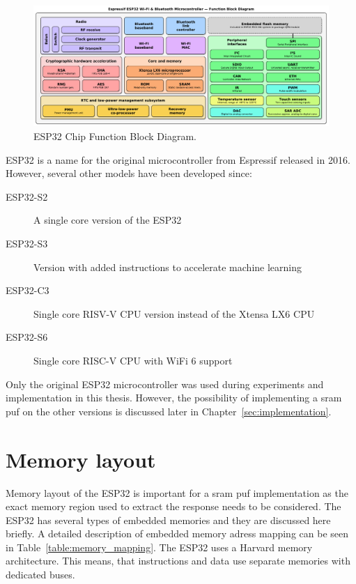 \begin{figure}[ht!]
    \centering
    \captionsetup{justification=centering,margin=0.5cm}
    \includegraphics[width=\textwidth]{images/esp32_diagram.pdf}
    \caption[ESP32 Chip Function Block Diagram.]{ESP32 Chip Function Block Diagram.\cite{Krent2018}}
    \label{fig:esp32_diagram}
\end{figure}

ESP32 is a name for the original microcontroller from Espressif released in 2016. However, several other models have been developed since\cite{espidf2022}:

\begin{description}
    \item[ESP32-S2] A single core version of the ESP32
    \item[ESP32-S3] Version with added instructions to accelerate machine learning
    \item[ESP32-C3] Single core RISV-V CPU version instead of the Xtensa LX6 CPU
    \item[ESP32-S6] Single core RISC-V CPU with WiFi 6 support
\end{description}

Only the original ESP32 microcontroller was used during experiments and implementation in this thesis. However, the possibility of implementing a \gls{sram} \gls{puf} on the other versions is discussed later in Chapter~\ref{sec:implementation}.

\section{Memory layout}\label{sec:memory_layout}

Memory layout of the ESP32 is important for a \gls{sram} \gls{puf} implementation as the exact memory region used to extract the response needs to be considered. The ESP32 has several types of embedded memories and they are discussed here briefly. A detailed description of embedded memory adress mapping can be seen in Table~\ref{table:memory_mapping}. The ESP32 uses a Harvard memory architecture. This means, that instructions and data use separate memories with dedicated buses.\cite{esp322021}

